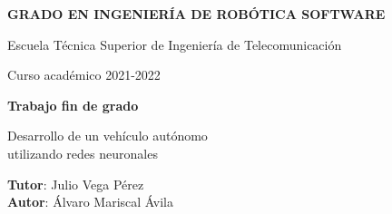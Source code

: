\thispagestyle{empty}
\vspace{2cm}

\begin{figure}[htb]
	\centerline{}
\end{figure}

\begin{center}
	{\Large {\bf GRADO EN INGENIERÍA DE ROBÓTICA SOFTWARE}}
	\vspace{5mm}

	{\large {Escuela Técnica Superior de Ingeniería de Telecomunicación}}
	\vspace{5mm}

	{\large {Curso académico 2021-2022}}

	\vspace{1cm}

	{\large {\bf Trabajo fin de grado}}

	\vspace{2cm}

	{\Large {Desarrollo de un vehículo autónomo\\
			utilizando redes neuronales\\[1cm] }}

	\vspace{5cm}
	{\bf Tutor}: Julio Vega Pérez \\
	{\bf Autor}: Álvaro Mariscal Ávila
\end{center}

\clearpage
\thispagestyle{empty}
